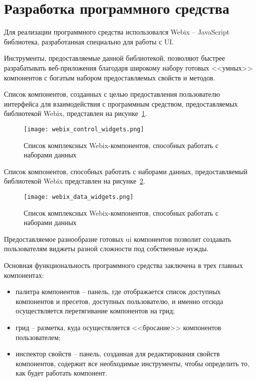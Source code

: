 \section{Разработка программного средства} 
\label{sec:development}

Для реализации программного средства использовался Webix -- JavaScript библиотека, разработанная специально для работы с UI.

Инструменты, предоставляемые данной библиотекой, позволяют быстрее разрабатывать веб-приложения благодаря широкому набору готовых <<умных>> компонентов с богатым набором предоставляемых свойств и методов.

Список компонентов, созданных с целью предоставления пользователю интерфейса для взаимодействия с программным средством, предоставляемых библиотекой Webix, представлен на рисунке~\ref{sec:development:webix_control_widgets}.

\begin{figure}[ht]
  \centering
    \texttt{[image: webix\_control\_widgets.png]}
    \caption{Список комплексных Webix-компонентов, способных работать с наборами данных}
    \label{sec:development:webix_control_widgets}
\end{figure}

Список компонентов, способных работать с наборами данных, предоставляемый библиотекой Webix представлен на рисунке~\ref{sec:development:webix_data_widgets}.

\begin{figure}[ht]
  \centering
    \texttt{[image: webix\_data\_widgets.png]}
    \caption{Список комплексных Webix-компонентов, способных работать с наборами данных}
    \label{sec:development:webix_data_widgets}
\end{figure}

Предоставляемое разнообразие готовых ui компонентов позволит создавать пользователям виджеты разной сложности под собственные нужды. \pagebreak

Основная функциональность программного средства заключена в трех главных компонентах: 
\begin{itemize}
	\item палитра компонентов -- панель, где отображается список доступных компонентов и пресетов, доступных пользователю, и именно отсюда осуществляется перетягивание компонентов на грид;
	\item грид -- разметка, куда осуществляется <<бросание>> компонентов пользователем;
	\item инспектор свойств -- панель, созданная для редактирования свойств компонентов, содержит все необходимые инструменты, чтобы определить то, как будет работать компонент.
\end{itemize}
  
